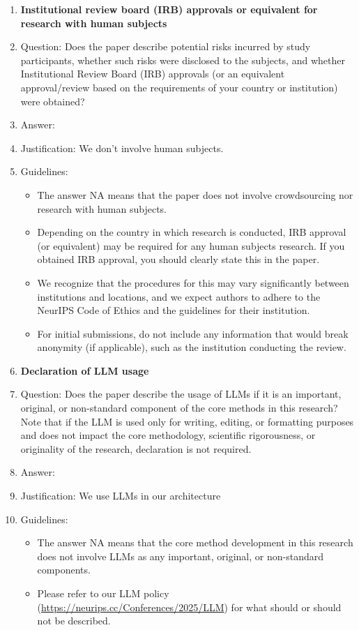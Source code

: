 \documentclass{article}
\theoremstyle{plain}
\theoremstyle{definition}
\theoremstyle{remark}
\begin{document}
\begin{enumerate}
\item {\bf Institutional review board (IRB) approvals or equivalent for research with human subjects}
    \item[] Question: Does the paper describe potential risks incurred by study participants, whether such risks were disclosed to the subjects, and whether Institutional Review Board (IRB) approvals (or an equivalent approval/review based on the requirements of your country or institution) were obtained?
    \item[] Answer: \answerNA{} %
    \item[] Justification: We don’t involve human subjects.
    \item[] Guidelines:
    \begin{itemize}
        \item The answer NA means that the paper does not involve crowdsourcing nor research with human subjects.
        \item Depending on the country in which research is conducted, IRB approval (or equivalent) may be required for any human subjects research. If you obtained IRB approval, you should clearly state this in the paper. 
        \item We recognize that the procedures for this may vary significantly between institutions and locations, and we expect authors to adhere to the NeurIPS Code of Ethics and the guidelines for their institution. 
        \item For initial submissions, do not include any information that would break anonymity (if applicable), such as the institution conducting the review.
    \end{itemize}

\item {\bf Declaration of LLM usage}
    \item[] Question: Does the paper describe the usage of LLMs if it is an important, original, or non-standard component of the core methods in this research? Note that if the LLM is used only for writing, editing, or formatting purposes and does not impact the core methodology, scientific rigorousness, or originality of the research, declaration is not required.
    \item[] Answer: \answerYes{} %
    \item[] Justification: We use LLMs in our architecture
    \item[] Guidelines:
    \begin{itemize}
        \item The answer NA means that the core method development in this research does not involve LLMs as any important, original, or non-standard components.
        \item Please refer to our LLM policy (\url{https://neurips.cc/Conferences/2025/LLM}) for what should or should not be described.
    \end{itemize}

\end{enumerate}
\clearpage
\appendix
\end{document}
